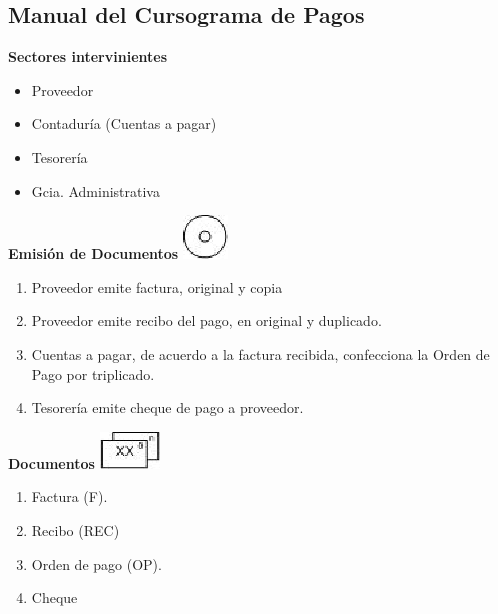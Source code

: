 \subsection{Manual del Cursograma de Pagos}

\begin{center}\textbf{Sectores intervinientes}\end{center}
\begin{itemize}
  \item Proveedor
  \item Contaduría (Cuentas a pagar)
  \item Tesorería
  \item Gcia. Administrativa
\end{itemize}

\begin{center}
  \textbf{Emisión de Documentos}
  \includegraphics{./Images/Simbolos/simbolo-Emision-de-Documentos.png}
\end{center}
\begin{enumerate}
  \item Proveedor emite factura, original y copia
  \item Proveedor emite recibo del pago, en original y duplicado.
  \item Cuentas a pagar, de acuerdo a la factura recibida, confecciona la Orden de Pago por triplicado.
  \item Tesorería emite cheque de pago a proveedor.
\end{enumerate}

\begin{center}
  \textbf{Documentos}
  \includegraphics{./Images/Simbolos/simbolo-Documentos.png}
\end{center}
\begin{enumerate}
  \item Factura (F).
  \item Recibo (REC)
  \item Orden de pago (OP).
  \item Cheque
\end{enumerate}

